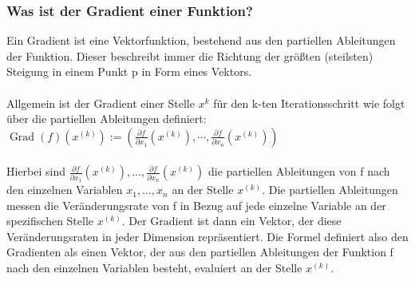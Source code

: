 \subsubsection{Was ist der Gradient einer Funktion?}\label{subsec:gradientenverfahren:was_ist_gradient}
  Ein Gradient ist eine Vektorfunktion, bestehend aus den partiellen Ableitungen der Funktion.
  Dieser beschreibt immer die Richtung der größten (steilsten) Steigung in einem Punkt p in Form eines Vektors.\cite{LH21}
  \\
  \\ Allgemein ist der Gradient einer Stelle $x^k$ für den k-ten Iterationsschritt wie folgt über die partiellen Ableitungen definiert:
  \\ $\operatorname{Grad}(f)(x^{(k)}) := \left(\frac{\partial f}{\partial x_{1}}(x^{(k)}), \cdots, \frac{\partial f}{\partial x_{n}}(x^{(k)})\right)$
  \\
  \\Hierbei sind $\frac{\partial f}{\partial x_{1}}(x^{(k)}), \dots, \frac{\partial f}{\partial x_{n}}(x^{(k)})$ die partiellen Ableitungen von f nach den einzelnen Variablen $x_{1}, \ldots, x_{n}$ an der Stelle $x^{(k)}$.
  Die partiellen Ableitungen messen die Veränderungsrate von f in Bezug auf jede einzelne Variable an der spezifischen Stelle $x^{(k)}$. Der Gradient ist dann ein Vektor, der diese Veränderungsraten in jeder Dimension repräsentiert.
  Die Formel definiert also den Gradienten als einen Vektor, der aus den partiellen Ableitungen der Funktion f nach den einzelnen Variablen besteht, evaluiert an der Stelle $x^{(k)}$.
\fi
